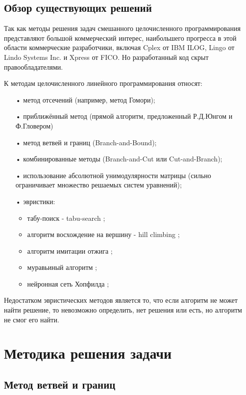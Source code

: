 \documentclass[a4paper,14pt,russian]{extreport}
\begin{document}
\section{Обзор существующих решений}

Так как методы решения задач смешанного целочисленного программирования представляют большой коммерческий интерес, наибольшего прогресса в этой области коммерческие разработчики, включая Cplex от IBM ILOG, Lingo от Lindo Systems Inc. и Xpress от FICO. Но разработанный код скрыт правообладателями. 
\par К методам целочисленного линейного программирования относят:
  \begin{itemize}
  \item[•] метод отсечений (например, метод Гомори);
  \item[•] приближённый метод (прямой алгоритм, предложенный Р.Д.Юнгом и Ф.Гловером)
  \item[•] метод ветвей и границ (Branch-and-Bound);
  \item[•] комбинированные методы (Branch-and-Cut или Cut-and-Branch);
  \item[•] использование абсолютной унимодулярности матрицы (сильно ограничивает множество решаемых систем уравнений);
  \item[•] эвристики:
    \begin{itemize}
    \item табу-поиск - tabu-search \cite{glover};
    \item алгоритм восхождение на вершину - hill climbing \cite{russell};
    \item алгоритм имитации отжига \cite{kirkpatrick};
    \item муравьиный алгоритм \cite{colorni};
    \item нейронная сеть Хопфилда \cite{lau};
    \end{itemize}
  \end{itemize}
\par Недостатком эвристических методов является то, что если алгоритм не может найти решение, то невозможно определить, нет решения или есть, но алгоритм не смог его найти. 


\chapter{Методика решения задачи}

\section{Метод ветвей и границ}
\end{document}
